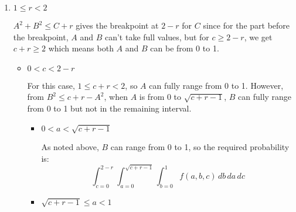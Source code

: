 \documentclass[12pt, oneside]{article}
\begin{document}
\begin{enumerate}
{\begin{enumerate}
{\begin{itemize}
{                    \(\therefore\) The required probability is:
                    \[
                        \int_{c = 1 - r}^{1} \int_{a=0}^{\sqrt{c + r - 1}} 
                        \int_{b = 0}^{1} f(a, b, c)\, db\, da\, dc
                        + \int_{c = 1 - r}^{1} \int_{\sqrt{c + r - 1}}^{1} 
                        \int_{b = 0}^{\sqrt{c + r - a^2}} f(a, b, c)\, db\, da\, dc
                    \]
                }
            \end{itemize}

            Totalling up the probabilities for this case, we have
            \begin{align*}
                P(R \leq r) &= \int_{c = 0}^{1 - r} \int_{a=0}^{\sqrt{c + r}} 
                \int_{b = 0}^{\sqrt{c + r - a^2}} f(a, b, c)\, db\, da\, dc \\
                &+ \int_{c = 1 - r}^{1} \int_{a=0}^{\sqrt{c + r - 1}} 
                \int_{b = 0}^{1} f(a, b, c)\, db\, da\, dc \\
                &+ \int_{c = 1 - r}^{1} \int_{\sqrt{c + r - 1}}^{1} 
                \int_{b = 0}^{\sqrt{c + r - a^2}} f(a, b, c)\, db\, da\, dc
            \end{align*}
        }

        \item {
            \(1 \leq r < 2\)

            \(A^2 + B^2 \leq C + r\) gives the breakpoint at \(2 - r\) for \(C\) since
            for the part before the breakpoint, \(A\) and \(B\) can't take full values,
            but for \(c \geq 2 - r\), we get \(c + r \geq 2\) which means both \(A\) and \(B\)
            can be from 0 to 1.

            \begin{itemize}
                \item {
                    \(0 < c < 2 - r\)

                    For this case, \(1 \leq c + r < 2\), so \(A\) can fully range from
                    0 to 1. However, from \(B^2 \leq c + r - A^2\), when \(A\) is from 0 to
                    \(\sqrt{c + r - 1}\), \(B\) can fully range from 0 to 1 but not in the
                    remaining interval.

                    \begin{itemize}
                        \item {
                            \(0 < a < \sqrt{c + r - 1}\)

                            As noted above, \(B\) can range from 0 to 1, so the required probability
                            is:
                            \[
                                \int_{c = 0}^{2 - r} \int_{a=0}^{\sqrt{c + r - 1}} 
                                \int_{b = 0}^{1} f(a, b, c)\, db\, da\, dc
                            \]
                        }
                        \item {
                            \(\sqrt{c + r - 1} \leq a < 1\)

}
\end{itemize}}
\end{itemize}}
\end{enumerate}}
\end{enumerate}
\end{document}
